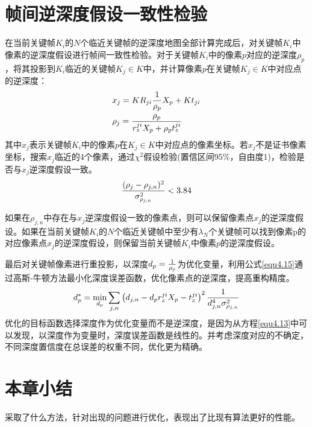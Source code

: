 \section{帧间逆深度假设一致性检验}
在当前关键帧$K_i$的$N$个临近关键帧的逆深度地图全部计算完成后，对关键帧$K_i$中像素的逆深度假设进行帧间一致性检验。对于关键帧$K_i$中的像素$p$对应的逆深度$\rho_p$，将其投影到$K_i$临近的关键帧$K_j \in K$中，并计算像素$p$在关键帧$K_j \in K$中对应点的逆深度：
\begin{equation}
\label{equ4.13}
\begin{aligned}
& x_j = K R_{ji} {1 \over \rho_p} X_p + Kt_{ji} \\ 
& \rho_j = { \rho_p \over r_z^{ji}X_p+\rho_p t_z^{ji} }
\end{aligned}
\end{equation}
其中$x_{j}$表示关键帧$K_i$中的像素$p$在$K_j \in K$中对应点的像素坐标。若$x_j$不是证书像素坐标，搜索$x_{j}$临近的4个像素，通过$\chi^2$假设检验(置信区间$95\%$，自由度$1$)，检验是否与$x_j$逆深度假设一致。
\begin{equation}
\label{equ4.14}
{ (\rho_j - \rho_{j,n})^2 \over \sigma_{\rho_{j,n}}^2 } < 3.84
\end{equation}

如果在$\rho_{j,n}$中存在与$x_j$逆深度假设一致的像素点，则可以保留像素点$x_j$的逆深度假设。如果在当前关键帧$K_i$的$N$个临近关键帧中至少有$\lambda_N$个关键帧可以找到像素p的对应像素点$x_j$的逆深度假设，则保留当前关键帧$K_i$中像素$p$的逆深度假设。

最后对关键帧像素进行重投影，以深度$d_p = { 1 \over \rho_p }$为优化变量，利用公式\eqref{equ4.15}通过高斯-牛顿方法最小化深度误差函数，优化像素点的逆深度，提高重构精度。
\begin{equation}
\label{equ4.15}
d_p^* = \min_{d_p} \sum\limits_{j,n} \left( d_{j,n} - d_p r_z^{ji} X_p - t_z^{ji}  \right)^2  {1 \over {d_{j,n}^4 \sigma_{\rho_{j,n}}^2 }}
\end{equation}
优化的目标函数选择深度作为优化变量而不是逆深度，是因为从方程\eqref{equ4.13}中可以发现，以深度作为变量时，深度误差函数是线性的。并考虑深度对应的不确定，不同深度置信度在总误差的权重不同，优化更为精确。




\section{本章小结}

采取了什么方法，针对出现的问题进行优化，表现出了比现有算法更好的性能。







